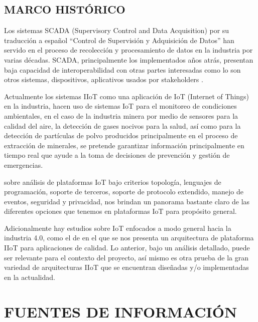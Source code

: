 \documentclass[stu,12pt,floatsintext]{apa7}
\begin{document}
	\subsection{MARCO HISTÓRICO}
	
	Los sistemas SCADA (Supervisory Control and Data Acquisition) por su traducción a español ``Control de Supervisión y Adquisición de Datos'' han servido en el proceso de recolección y procesamiento de datos en la industria por varias décadas.  SCADA, principalmente los implementados años atrás, presentan baja capacidad de interoperabilidad con otras partes interesadas como lo son otros sistemas, dispositivos, aplicativos usados por stakeholders \cite{SCADA_UMaT}.
	
	Actualmente los sistemas IIoT como una aplicación de IoT (Internet of Things) en la industria, hacen uso de sistemas IoT para el monitoreo de condiciones ambientales, en el caso de la industria minera por medio de sensores para la calidad del aire, la detección de gases nocivos para la salud, así como para la detección de partículas de polvo producidos principalmente en el proceso de extracción de minerales, se pretende garantizar información principalmente en tiempo real que ayude a la toma de decisiones de prevención y gestión de emergencias\cite{reference-1}.
	
	
	\cite{BABUN2021108040} sobre análisis de plataformas IoT bajo criterios topología, lenguajes de programación, soporte de terceros,  soporte de protocolo extendido, manejo de eventos, seguridad y privacidad, nos brindan un panorama bastante claro de las diferentes opciones que tenemos en plataformas IoT para propósito general.
	
	Adicionalmente hay estudios sobre IoT enfocados a modo general hacia la industria 4.0, como el de \cite{CHRISTOU2022103591} en el que se nos presenta un arquitectura de plataforma IIoT para aplicaciones de calidad. Lo anterior, bajo un análisis detallado, puede ser relevante para el contexto del proyecto, así mismo es otra prueba de la gran variedad de arquitecturas IIoT que se encuentran diseñadas y/o implementadas en la actualidad.
	\section{FUENTES DE INFORMACIÓN}
\end{document}

